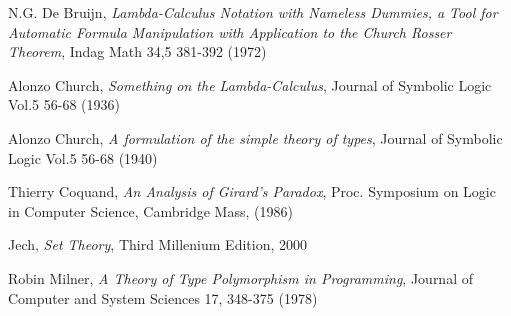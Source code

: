 \documentclass[11pt,a4paper]{article}
\begin{document}
\newpage

\newpage

\newpage

\newpage

\newpage



\begin{thebibliography}{99}

 N.G. De Bruijn, \emph{Lambda-Calculus Notation with Nameless Dummies, a Tool for Automatic Formula Manipulation with Application to the Church Rosser Theorem}, Indag Math 34,5 381-392 (1972)

 Alonzo Church, \emph{Something on the Lambda-Calculus}, Journal of Symbolic Logic Vol.5 56-68 (1936)

 Alonzo Church, \emph{A formulation of the simple theory of types}, Journal of Symbolic Logic Vol.5 56-68 (1940)

 Thierry Coquand, \emph{An Analysis of Girard's Paradox}, Proc. Symposium on Logic in Computer Science, Cambridge Mass, (1986) 

 Jech, \emph{Set Theory}, Third Millenium Edition, 2000

 Robin Milner, \emph{A Theory of Type Polymorphism in Programming}, Journal of Computer and System Sciences 17, 348-375 (1978)

\end{thebibliography}

\twocolumn{\small}
\end{document}
